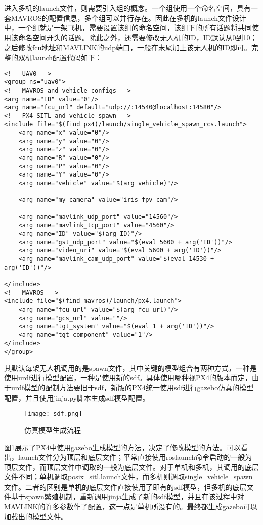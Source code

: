 进入多机的launch文件，则需要引入组的概念。一个组使用一个命名空间，具有一套MAVROS的配置信息，多个组可以并行存在。因此在多机的launch文件设计中，一个组就是一架飞机，需要设置该组的命名空间，该组下的所有话题将共同使用该命名空间开头的话题。除此之外，还需要修改无人机的ID，ID默认从0到10；之后修改fcu地址和MAVLINK的udp端口，一般在末尾加上该无人机的ID即可。完整的双机launch配置代码如下：

\begin{verbatim}
<!-- UAV0 -->
<group ns="uav0">
<!-- MAVROS and vehicle configs -->
<arg name="ID" value="0"/>
<arg name="fcu_url" default="udp://:14540@localhost:14580"/>
<!-- PX4 SITL and vehicle spawn -->
<include file="$(find px4)/launch/single_vehicle_spawn_rcs.launch">
    <arg name="x" value="0"/>
    <arg name="y" value="0"/>
    <arg name="z" value="0"/>
    <arg name="R" value="0"/>
    <arg name="P" value="0"/>
    <arg name="Y" value="0"/>
    <arg name="vehicle" value="$(arg vehicle)"/>

    <arg name="my_camera" value="iris_fpv_cam"/>

    <arg name="mavlink_udp_port" value="14560"/>
    <arg name="mavlink_tcp_port" value="4560"/>
    <arg name="ID" value="$(arg ID)"/>
    <arg name="gst_udp_port" value="$(eval 5600 + arg('ID'))"/>
    <arg name="video_uri" value="$(eval 5600 + arg('ID'))"/>
    <arg name="mavlink_cam_udp_port" value="$(eval 14530 + arg('ID'))"/>

</include>
<!-- MAVROS -->
<include file="$(find mavros)/launch/px4.launch">
    <arg name="fcu_url" value="$(arg fcu_url)"/>
    <arg name="gcs_url" value=""/>
    <arg name="tgt_system" value="$(eval 1 + arg('ID'))"/>
    <arg name="tgt_component" value="1"/>
</include>
</group>
\end{verbatim}

其默认每架无人机调用的是spawn文件，其中关键的模型组合有两种方式，一种是使用urdf进行模型配置，一种是使用新的sdf。具体使用哪种视PX4的版本而定，由于urdf模型的配制方法要旧于sdf，新版的PX4统一使用sdf进行gazebo仿真的模型配置，并且使用jinja.py脚本生成sdf模型配置。
~\\
\begin{figure}[!ht]
	\centering
	\texttt{[image: sdf.png]}
	\caption{仿真模型生成流程}
	\label{fig-sdf}
\end{figure}

图\ref{fig-sdf}展示了PX4中使用gazebo生成模型的方法，决定了修改模型的方法。可以看出，launch文件分为顶层和底层文件；平常直接使用roslaunch命令启动的一般为顶层文件，而顶层文件中调取的一般为底层文件。对于单机和多机，其调用的底层文件不同；单机调取posix\_sitl.launch文件，而多机则调取single\_vehicle\_spawn文件。二者的区别是单机的底层文件直接使用了即有的sdf模型，但多机的底层文件基于spawn繁殖机制，重新调用jinja生成了新的sdf模型，并且在该过程中对MAVLINK的许多参数作了配置，这一点是单机所没有的。最终都生成gazebo可以加载出的模型文件。

